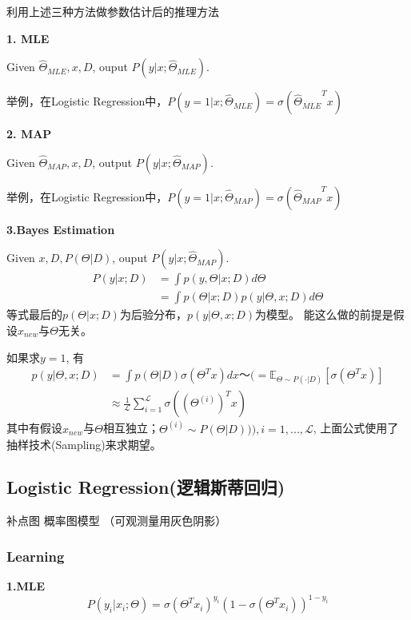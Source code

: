 \documentclass[UTF8]{ctexart}
\numberwithin{equation}{section}
\begin{document}
利用上述三种方法做参数估计后的推理方法


\textbf{1. MLE}

Given $\hat \Theta_{MLE}, x, D$, ouput $P(y | x; \hat \Theta_{MLE} )$.

举例，在Logistic Regression中，$P(y=1|x;\hat \Theta_{MLE} )=\sigma({\hat \Theta_{MLE} }^T x)$

\textbf{2. MAP}

Given $\hat \Theta_{MAP}, x, D$, output $P(y | x; \hat \Theta_{MAP} )$.

举例，在Logistic Regression中，$P(y=1|x;\hat \Theta_{MAP} )=\sigma({\hat \Theta_{MAP} }^T x)$

\textbf{3.Bayes Estimation}

Given $ x, D, P(\Theta|D)$, ouput $P(y | x; \hat \Theta_{MAP} )$.
\begin{equation*}
    \begin{aligned}
        P(y|x;D) &= \int p(y, \Theta | x;D) d\Theta    \\
        &= \int p(\Theta | x;D)p(y|\Theta,x;D)d\Theta
    \end{aligned}    
\end{equation*}
等式最后的$p(\Theta | x;D)$为后验分布，$p(y|\Theta,x;D)$为模型。
能这么做的前提是假设$x_{new}$与$\Theta$无关。

如果求$y=1$, 有
\begin{equation*}
    \begin{aligned}
        p(y|\Theta,x;D)&=\int p(\Theta|D)\sigma(\Theta^T x)dx ～ (= \mathbb{E}_{{\Theta} \sim P(\cdot |D)}[\sigma(\Theta^Tx)] \\
        &\approx \frac{1}{\mathcal{L}} \sum_{i=1}^{\mathcal{L}} \sigma((\Theta^{(i)})^Tx)
    \end{aligned}
\end{equation*}
其中有假设$x_{new}$与$\Theta$相互独立；$\Theta^{(i)} \sim P(\Theta |D))), i=1,...,\mathcal{L}$, 上面公式使用了抽样技术(Sampling)来求期望。

\subsection{Logistic Regression(逻辑斯蒂回归)}
补点图 概率图模型 （可观测量用灰色阴影）

\subsubsection*{\textbf{Learning}}

\textbf{1.MLE}
\begin{equation*}
    P(y_i|x_i;\Theta) = \sigma(\Theta^T x_i)^{y_i} (1-\sigma(\Theta^Tx_i))^{1-y_i}
\end{equation*}
\end{document}
